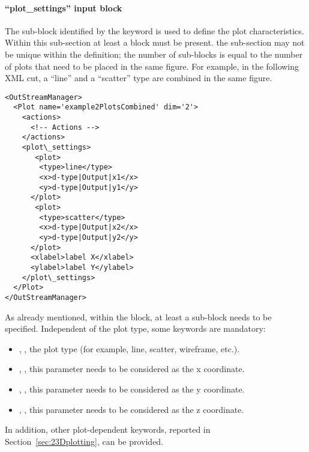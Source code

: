 \paragraph{``plot\_settings'' input block \label{sec:plotSettings}}
The sub-block identified by the keyword  is used to
define the plot characteristics.
%
Within this sub-section at least a  block must be present.
%
the  sub-section may not be unique within the
 definition; the number of  sub-blocks is
equal to the number of plots that need to be placed in the same figure.
%
For example, in the following XML cut, a ``line'' and a ``scatter'' type are
combined in the same figure.
%
\begin{lstlisting}[style=XML,morekeywords={dim,name}]
<OutStreamManager>
  <Plot name='example2PlotsCombined' dim='2'>
    <actions>
      <!-- Actions -->
    </actions>
    <plot\_settings>
       <plot>
        <type>line</type>
        <x>d-type|Output|x1</x>
        <y>d-type|Output|y1</y>
      </plot>
       <plot>
        <type>scatter</type>
        <x>d-type|Output|x2</x>
        <y>d-type|Output|y2</y>
      </plot>
      <xlabel>label X</xlabel>
      <ylabel>label Y</ylabel>
    </plot\_settings>
  </Plot>
</OutStreamManager>
\end{lstlisting}
As already mentioned, within the  block, at least a
 sub-block needs to be specified.
%
Independent of the plot type, some keywords are mandatory:
\begin{itemize}
  \item {}, , the plot type (for
  example, line, scatter, wireframe, etc.).
  \item {}, , this parameter needs
  to be considered as the x coordinate.
  \item {}, , this parameter needs
  to be considered as the y coordinate.
  \item {}, , this
  parameter needs to be considered as the z coordinate.
\end{itemize}
In addition, other plot-dependent keywords, reported in
Section~\ref{sec:23Dplotting}, can be provided.

